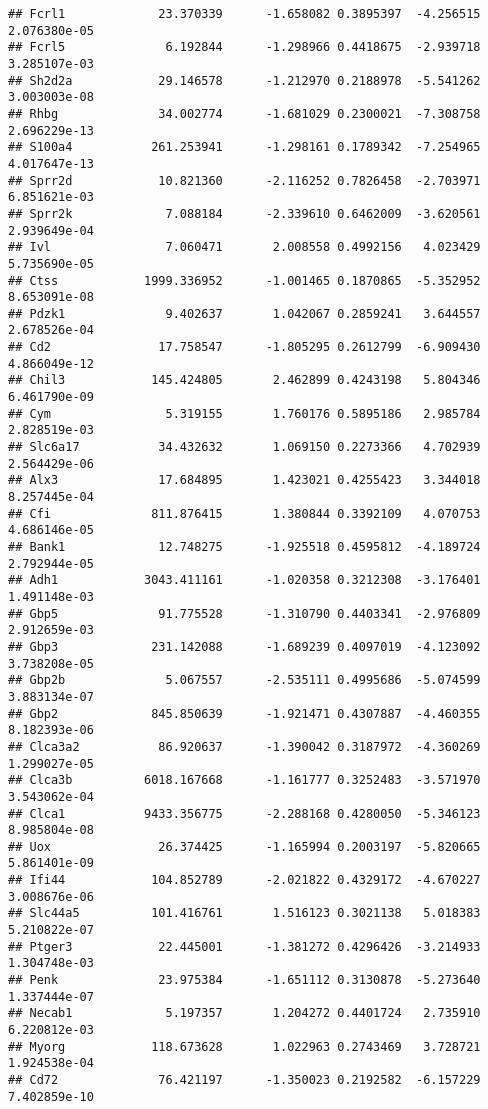 \documentclass[
]{article}
\begin{document}
\begin{verbatim}
## Fcrl1             23.370339      -1.658082 0.3895397  -4.256515 2.076380e-05
## Fcrl5              6.192844      -1.298966 0.4418675  -2.939718 3.285107e-03
## Sh2d2a            29.146578      -1.212970 0.2188978  -5.541262 3.003003e-08
## Rhbg              34.002774      -1.681029 0.2300021  -7.308758 2.696229e-13
## S100a4           261.253941      -1.298161 0.1789342  -7.254965 4.017647e-13
## Sprr2d            10.821360      -2.116252 0.7826458  -2.703971 6.851621e-03
## Sprr2k             7.088184      -2.339610 0.6462009  -3.620561 2.939649e-04
## Ivl                7.060471       2.008558 0.4992156   4.023429 5.735690e-05
## Ctss            1999.336952      -1.001465 0.1870865  -5.352952 8.653091e-08
## Pdzk1              9.402637       1.042067 0.2859241   3.644557 2.678526e-04
## Cd2               17.758547      -1.805295 0.2612799  -6.909430 4.866049e-12
## Chil3            145.424805       2.462899 0.4243198   5.804346 6.461790e-09
## Cym                5.319155       1.760176 0.5895186   2.985784 2.828519e-03
## Slc6a17           34.432632       1.069150 0.2273366   4.702939 2.564429e-06
## Alx3              17.684895       1.423021 0.4255423   3.344018 8.257445e-04
## Cfi              811.876415       1.380844 0.3392109   4.070753 4.686146e-05
## Bank1             12.748275      -1.925518 0.4595812  -4.189724 2.792944e-05
## Adh1            3043.411161      -1.020358 0.3212308  -3.176401 1.491148e-03
## Gbp5              91.775528      -1.310790 0.4403341  -2.976809 2.912659e-03
## Gbp3             231.142088      -1.689239 0.4097019  -4.123092 3.738208e-05
## Gbp2b              5.067557      -2.535111 0.4995686  -5.074599 3.883134e-07
## Gbp2             845.850639      -1.921471 0.4307887  -4.460355 8.182393e-06
## Clca3a2           86.920637      -1.390042 0.3187972  -4.360269 1.299027e-05
## Clca3b          6018.167668      -1.161777 0.3252483  -3.571970 3.543062e-04
## Clca1           9433.356775      -2.288168 0.4280050  -5.346123 8.985804e-08
## Uox               26.374425      -1.165994 0.2003197  -5.820665 5.861401e-09
## Ifi44            104.852789      -2.021822 0.4329172  -4.670227 3.008676e-06
## Slc44a5          101.416761       1.516123 0.3021138   5.018383 5.210822e-07
## Ptger3            22.445001      -1.381272 0.4296426  -3.214933 1.304748e-03
## Penk              23.975384      -1.651112 0.3130878  -5.273640 1.337444e-07
## Necab1             5.197357       1.204272 0.4401724   2.735910 6.220812e-03
## Myorg            118.673628       1.022963 0.2743469   3.728721 1.924538e-04
## Cd72              76.421197      -1.350023 0.2192582  -6.157229 7.402859e-10

\end{verbatim}
\end{document}
